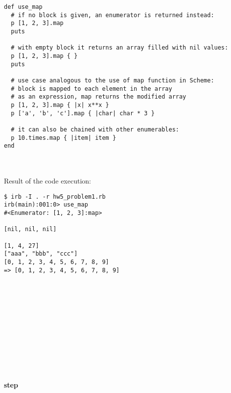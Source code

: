 \documentclass{article}
\begin{document}
\begin{verbatim}
def use_map
  # if no block is given, an enumerator is returned instead:
  p [1, 2, 3].map
  puts

  # with empty block it returns an array filled with nil values:
  p [1, 2, 3].map { }
  puts

  # use case analogous to the use of map function in Scheme:
  # block is mapped to each element in the array
  # as an expression, map returns the modified array
  p [1, 2, 3].map { |x| x**x }
  p ['a', 'b', 'c'].map { |char| char * 3 }

  # it can also be chained with other enumerables:
  p 10.times.map { |item| item }
end
\end{verbatim}

\paragraph{}\

Result of the code execution:

\begin{verbatim} 
$ irb -I . -r hw5_problem1.rb
irb(main):001:0> use_map
#<Enumerator: [1, 2, 3]:map>

[nil, nil, nil]

[1, 4, 27]
["aaa", "bbb", "ccc"]
[0, 1, 2, 3, 4, 5, 6, 7, 8, 9]
=> [0, 1, 2, 3, 4, 5, 6, 7, 8, 9]
\end{verbatim}

\paragraph{}\
\paragraph{}\
\paragraph{}\
\paragraph{}\
\paragraph{}\


\paragraph{ step}\
\end{document}
